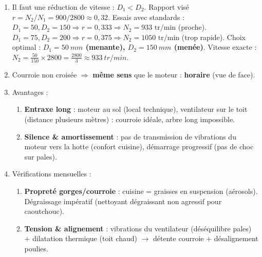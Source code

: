 \documentclass[11pt]{article}
\begin{document}
\begin{corrige}
\begin{enumerate}
\item Il faut une réduction de vitesse : $D_1 < D_2$. Rapport visé $r = N_2/N_1 = 900/2800 \approx 0,32$.
      Essais avec standards :
      $D_1=50, D_2=150 \Rightarrow r=0,333 \Rightarrow N_2 = 933 \text{ tr/min}$ (proche).
      $D_1=75, D_2=200 \Rightarrow r=0,375 \Rightarrow N_2 = 1050 \text{ tr/min}$ (trop rapide).
      Choix optimal : \textbf{$D_1 = \SI{50}{mm}$ (menante), $D_2 = \SI{150}{mm}$ (menée)}.
      Vitesse exacte : $N_2 = \frac{50}{150} \times 2800 = \frac{2800}{3} \approx \SI{933}{tr/min}$.
\item Courroie non croisée $\Rightarrow$ \textbf{même sens} que le moteur : \textbf{horaire} (vue de face).
\item Avantages :
      \begin{enumerate}
      \item \textbf{Entraxe long} : moteur au sol (local technique), ventilateur sur le toit (distance plusieurs mètres) : courroie idéale, arbre long impossible.
      \item \textbf{Silence \& amortissement} : pas de transmission de vibrations du moteur vers la hotte (confort cuisine), démarrage progressif (pas de choc sur pales).
      \end{enumerate}
\item Vérifications mensuelles :
      \begin{enumerate}
      \item \textbf{Propreté gorges/courroie} : cuisine = graisses en suspension (aérosols). Dégraissage impératif (nettoyant dégraissant non agressif pour caoutchouc).
      \item \textbf{Tension \& alignement} : vibrations du ventilateur (déséquilibre pales) + dilatation thermique (toit chaud) $\rightarrow$ détente courroie + désalignement poulies.
      \end{enumerate}
\end{enumerate}
\end{corrige}
\end{document}
